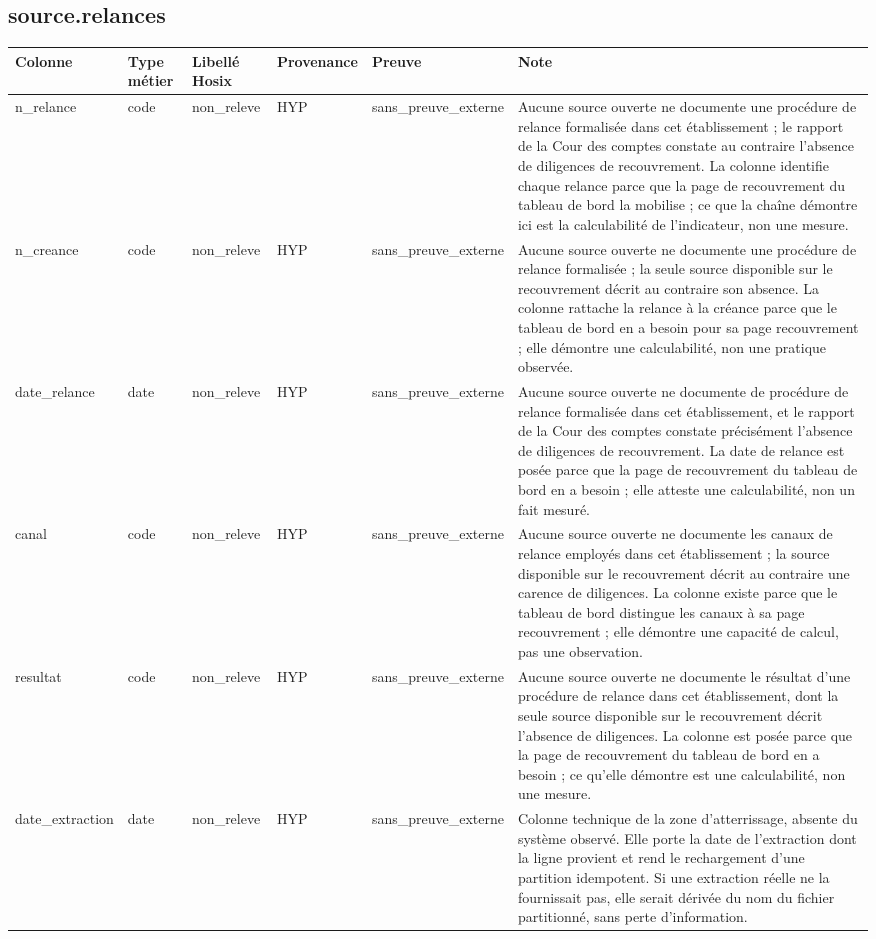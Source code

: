 \subsection*{source.relances}
\begin{longtable}{p{2.5cm}p{1.8cm}p{2.8cm}p{1.3cm}p{2.2cm}p{5cm}}
\hline
Colonne & Type métier & Libellé Hosix & Provenance & Preuve & Note \\
\hline
\endhead
n\_relance & code & non\_releve & HYP & sans\_preuve\_externe & Aucune source ouverte ne documente une procédure de relance formalisée dans cet établissement ; le rapport de la Cour des comptes constate au contraire l'absence de diligences de recouvrement. La colonne identifie chaque relance parce que la page de recouvrement du tableau de bord la mobilise ; ce que la chaîne démontre ici est la calculabilité de l'indicateur, non une mesure. \\
n\_creance & code & non\_releve & HYP & sans\_preuve\_externe & Aucune source ouverte ne documente une procédure de relance formalisée ; la seule source disponible sur le recouvrement décrit au contraire son absence. La colonne rattache la relance à la créance parce que le tableau de bord en a besoin pour sa page recouvrement ; elle démontre une calculabilité, non une pratique observée. \\
date\_relance & date & non\_releve & HYP & sans\_preuve\_externe & Aucune source ouverte ne documente de procédure de relance formalisée dans cet établissement, et le rapport de la Cour des comptes constate précisément l'absence de diligences de recouvrement. La date de relance est posée parce que la page de recouvrement du tableau de bord en a besoin ; elle atteste une calculabilité, non un fait mesuré. \\
canal & code & non\_releve & HYP & sans\_preuve\_externe & Aucune source ouverte ne documente les canaux de relance employés dans cet établissement ; la source disponible sur le recouvrement décrit au contraire une carence de diligences. La colonne existe parce que le tableau de bord distingue les canaux à sa page recouvrement ; elle démontre une capacité de calcul, pas une observation. \\
resultat & code & non\_releve & HYP & sans\_preuve\_externe & Aucune source ouverte ne documente le résultat d'une procédure de relance dans cet établissement, dont la seule source disponible sur le recouvrement décrit l'absence de diligences. La colonne est posée parce que la page de recouvrement du tableau de bord en a besoin ; ce qu'elle démontre est une calculabilité, non une mesure. \\
date\_extraction & date & non\_releve & HYP & sans\_preuve\_externe & Colonne technique de la zone d'atterrissage, absente du système observé. Elle porte la date de l'extraction dont la ligne provient et rend le rechargement d'une partition idempotent. Si une extraction réelle ne la fournissait pas, elle serait dérivée du nom du fichier partitionné, sans perte d'information. \\
\hline
\end{longtable}
